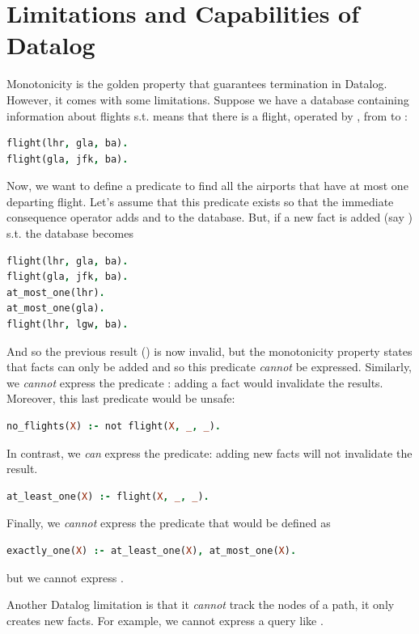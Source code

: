 \section{Limitations and Capabilities of Datalog}
Monotonicity is the golden property that guarantees termination in Datalog. However, it comes with some limitations.
Suppose we have a database containing information about flights s.t.  means that there is a flight, operated by , from  to :
\begin{lstlisting}[language=prolog]
flight(lhr, gla, ba).
flight(gla, jfk, ba).
\end{lstlisting}
Now, we want to define a predicate  to find all the airports that have at most one departing flight. 
Let's assume that this predicate exists so that the immediate consequence operator adds  and  to the database.
But, if a new fact is added (say ) s.t. the database becomes
\begin{lstlisting}[language=prolog]
flight(lhr, gla, ba).
flight(gla, jfk, ba).
at_most_one(lhr).
at_most_one(gla).
flight(lhr, lgw, ba).
\end{lstlisting}
And so the previous result () is now invalid, but the monotonicity property states that facts can only be added and so this predicate \emph{cannot} be expressed.
Similarly, we \emph{cannot} express the predicate : adding a fact would invalidate the results. Moreover, this last predicate would be unsafe:
\begin{lstlisting}[language=prolog]
no_flights(X) :- not flight(X, _, _).
\end{lstlisting}

In contrast, we \emph{can} express the  predicate: adding new facts will not invalidate the result.
\begin{lstlisting}[language=prolog]
at_least_one(X) :- flight(X, _, _).
\end{lstlisting}

Finally, we \emph{cannot} express the  predicate that would be defined as
\begin{lstlisting}[language=prolog]
exactly_one(X) :- at_least_one(X), at_most_one(X).
\end{lstlisting}
but we cannot express .

Another Datalog limitation is that it \emph{cannot} track the nodes of a path, it only creates new facts.
For example, we cannot express a query like .

